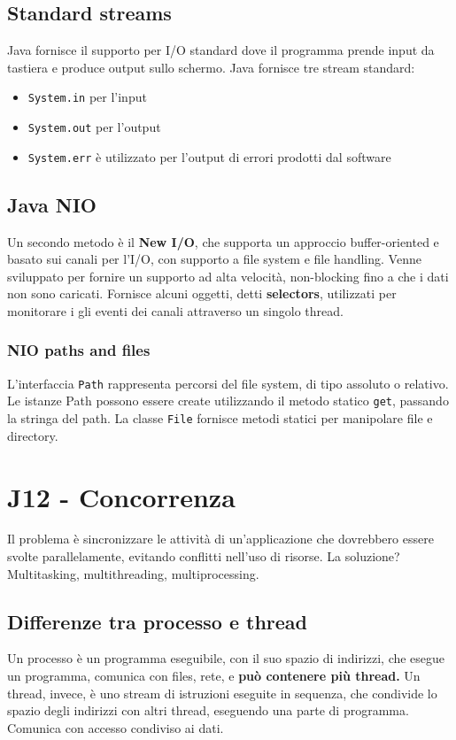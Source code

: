 \documentclass[11pt]{article}
\newcommand{\code}[1]{\texttt{#1}}
\begin{document}
\subsection{Standard streams}
Java fornisce il supporto per I/O standard dove il programma prende input da tastiera e produce output sullo schermo. Java fornisce tre stream standard:
\begin{itemize}
    \item \code{System.in} per l'input
    \item \code{System.out} per l'output
    \item \code{System.err} è utilizzato per l'output di errori prodotti dal software 
\end{itemize}
\subsection{Java NIO}
Un secondo metodo è il \textbf{New I/O}, che supporta un approccio buffer-oriented e basato sui canali per l'I/O, con supporto a file system e file handling. Venne sviluppato per fornire un supporto ad alta velocità, non-blocking fino a che i dati non sono caricati. Fornisce alcuni oggetti, detti \textbf{selectors}, utilizzati per monitorare i gli eventi dei canali attraverso un singolo thread. 
\subsubsection{NIO paths and files}
L'interfaccia \code{Path} rappresenta percorsi del file system, di tipo assoluto o relativo. Le istanze Path possono essere create utilizzando il metodo statico \code{get}, passando la stringa del path. La classe \code{File} fornisce metodi statici per manipolare file e directory.
\section{J12 - Concorrenza}
Il problema è sincronizzare le attività di un'applicazione che dovrebbero essere svolte parallelamente, evitando conflitti nell'uso di risorse. La soluzione? Multitasking, multithreading, multiprocessing. 
\subsection{Differenze tra processo e thread}
Un processo è un programma eseguibile, con il suo spazio di indirizzi, che esegue un programma, comunica con files, rete, e \textbf{può contenere più thread.} Un thread, invece, è uno stream di istruzioni eseguite in sequenza, che condivide lo spazio degli indirizzi con altri thread, eseguendo una parte di programma. Comunica con accesso condiviso ai dati. 
\end{document}
